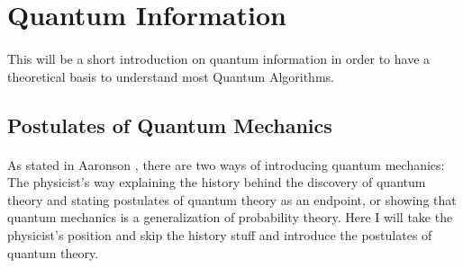 \section{Quantum Information}
\label{Sec: Quantum Information}

\paragraph{}This will be a short introduction on quantum information in order to have a theoretical basis to understand most Quantum Algorithms.
\subsection{Postulates of Quantum Mechanics}
\label{Subsec: Postulates of Quantum Mechanics}
\paragraph{}As stated in Aaronson \cite{Aaronson:2013:QCD:2487754}, there are two ways of introducing quantum mechanics: The physicist's way explaining the history behind the discovery of quantum theory and stating postulates of quantum theory as an endpoint, or showing that quantum mechanics is a generalization of probability theory. Here I will take the physicist's position and skip the history stuff and introduce the postulates of quantum theory.

